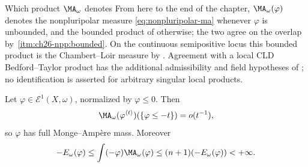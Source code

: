 \begin{warning}{Which product $\MA_\omega$ denotes}
From here to the end of the chapter, $\MA_\omega(\varphi)$ denotes the
nonpluripolar measure \eqref{eq:nonpluripolar-ma} whenever $\varphi$ is
unbounded, and the bounded product of 
otherwise; the two agree on the overlap by
\,\cref{itm:ch26-npp:bounded}.
On the continuous semipositive locus this bounded product is the
Chambert--Loir measure by .
Agreement with a local CLD Bedford--Taylor product has the additional
admissibility and field hypotheses of
; no identification is asserted for
arbitrary singular local products.
\end{warning}

\begin{proposition}\label{prop:e1-integrability-tail}
Let $\varphi\in\mathcal E^1(X,\omega)$, normalized by $\varphi\leq0$.
Then
\begin{equation}
\label{eq:e1-mass-tail}
 \MA_\omega(\varphi^{\langle t\rangle})
       (\{\varphi\leq-t\})=o(t^{-1}),
\end{equation}
so $\varphi$ has full Monge--Amp\`ere mass. Moreover
\begin{equation}
\label{eq:e1-integrability}
 -E_\omega(\varphi)
 \leq\int(-\varphi)\MA_\omega(\varphi)
 \leq(n+1)(-E_\omega(\varphi))<+\infty.
\end{equation}
\end{proposition}

